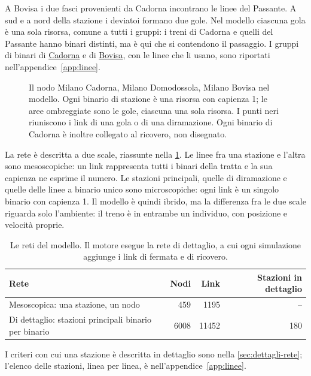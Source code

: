 A Bovisa i due fasci provenienti da Cadorna incontrano le linee del Passante. A sud e a nord della stazione i deviatoi formano due gole. Nel modello ciascuna gola è una sola risorsa, comune a tutti i gruppi: i treni di Cadorna e quelli del Passante hanno binari distinti, ma è qui che si contendono il passaggio. I gruppi di binari di \hyperlink{sta:S01066}{Cadorna} e di \hyperlink{sta:S01642}{Bovisa}, con le linee che li usano, sono riportati nell'appendice~\ref{app:linee}.

\begin{figure}[H]
	\centering
	
	\caption{Il nodo Milano Cadorna, Milano Domodossola, Milano Bovisa nel modello. Ogni binario di stazione è una risorsa con capienza 1; le aree ombreggiate sono le gole, ciascuna una sola risorsa. I punti neri riuniscono i link di una gola o di una diramazione. Ogni binario di Cadorna è inoltre collegato al ricovero, non disegnato.}
	\label{fig:modello-cadorna}
\end{figure}

La rete è descritta a due scale, riassunte nella \cref{tab:modello-reti}. Le linee fra una stazione e l'altra sono mesoscopiche: un link rappresenta tutti i binari della tratta e la sua capienza ne esprime il numero. Le stazioni principali, quelle di diramazione e quelle delle linee a binario unico sono microscopiche: ogni link è un singolo binario con capienza 1. Il modello è quindi ibrido, ma la differenza fra le due scale riguarda solo l'ambiente: il treno è in entrambe un individuo, con posizione e velocità proprie.

\begin{table}[H]
	\centering
	\caption{Le reti del modello. Il motore esegue la rete di dettaglio, a cui ogni simulazione aggiunge i link di fermata e di ricovero.}
	\label{tab:modello-reti}
	\begin{tabularx}{\textwidth}{Xrrr}
		\toprule
		Rete & Nodi & Link & Stazioni in dettaglio \\
		\midrule
		Mesoscopica: una stazione, un nodo & 459 & 1195 & -- \\
		Di dettaglio: stazioni principali binario per binario & 6008 & 11452 & 180 \\
		\bottomrule
	\end{tabularx}
\end{table}

I criteri con cui una stazione è descritta in dettaglio sono nella \cref{sec:dettagli-rete}; l'elenco delle stazioni, linea per linea, è nell'appendice~\ref{app:linee}.


